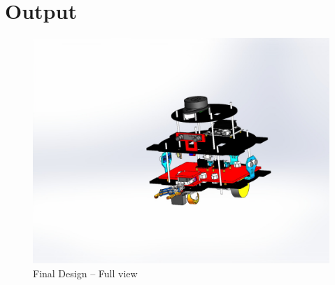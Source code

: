 \section{Output} %

\begin{figure}[h!]
	\centering
	\includegraphics[scale=0.23]{./Figures/Mech/full.jpeg}
	\caption{Final Design -- Full view}
	\label{fig:mech1}
\end{figure}

